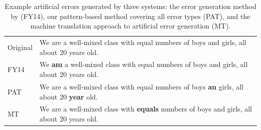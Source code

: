 \documentclass[11pt,letterpaper]{article}
\begin{document}
\begin{table}[t]
\setlength\tabcolsep{7pt}
\begin{tabular}{l|l} \hline
\normalsize
Original & We are a well-mixed class with equal numbers of boys and girls, all about 20 years old. \\
FY14 & We \textbf{am} a well-mixed class with equal numbers of boys and girls, all about 20 years old. \\
PAT & We are a well-mixed class with equal numbers of boys \textbf{an} girls, all about 20 \textbf{year} old. \\
MT & We are a well-mixed class with \textbf{equals} numbers of boys and girls, all about 20 years old. \\




\hline
\end{tabular}
\caption{Example artificial errors generated by three systems: the error generation method by  (FY14), our pattern-based method covering all error types (PAT), and the machine translation approach to artificial error generation (MT).}
\label{tab:examples}
\end{table}

\hspace{2cm}
\end{document}

